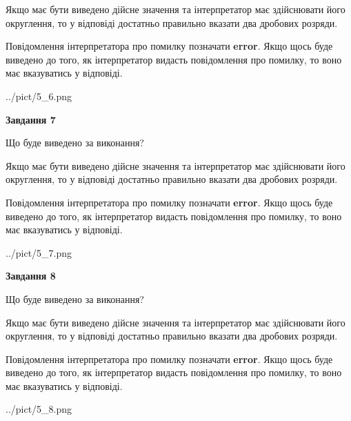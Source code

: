 \documentclass[12pt, ukrainian]{article}
\begin{document}
{\begin {Large}
Якщо має бути виведено дійсне значення та інтерпретатор має здійснювати його округлення, 
то у відповіді достатньо правильно вказати два дробових розряди.

Повідомлення інтерпретатора про помилку позначати \textbf{error}.
Якщо щось буде виведено до того, як інтерпретатор видасть повідомлення про помилку, 
то воно має вказуватись у відповіді. \par

\begin{center}
	{../pict/5_6.png}
\end{center}
\newpage

{\begin {center}\textbf{Завдання 7}\end {center}}\par
Що буде виведено за виконання? \par

Якщо має бути виведено дійсне значення та інтерпретатор має здійснювати його округлення, 
то у відповіді достатньо правильно вказати два дробових розряди.

Повідомлення інтерпретатора про помилку позначати \textbf{error}.
Якщо щось буде виведено до того, як інтерпретатор видасть повідомлення про помилку, 
то воно має вказуватись у відповіді. \par

\begin{center}
	{../pict/5_7.png}
\end{center}
\newpage

{\begin {center}\textbf{Завдання 8}\end {center}}\par
Що буде виведено за виконання? \par

Якщо має бути виведено дійсне значення та інтерпретатор має здійснювати його округлення, 
то у відповіді достатньо правильно вказати два дробових розряди.

Повідомлення інтерпретатора про помилку позначати \textbf{error}.
Якщо щось буде виведено до того, як інтерпретатор видасть повідомлення про помилку, 
то воно має вказуватись у відповіді. \par

\begin{center}
	{../pict/5_8.png}
\end{center}
\newpage


\end{Large}}
\end{document}
